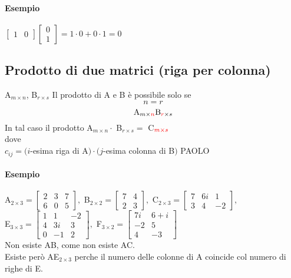 \paragraph{Esempio} 
$
\begin{bmatrix}
    1 & 0
\end{bmatrix}
\begin{bmatrix}
    0 \\1
\end{bmatrix}
=1\cdot 0 + 0\cdot 1= 0 $


\subsection{Prodotto di due matrici (riga per colonna) } 
A$_{m\times n}$, B$_{r\times s}$ Il prodotto di A e B è possibile solo se 
$$n = r$$
$$\textrm{A}_{m\times {\color{red}n}} \textrm{B}_{{\color{red}r}\times s}$$
In tal caso il prodotto 
A$_{m\times n}\cdot$ B$_{r\times s}=$ C$_{\color{red}m\times s}$\\
dove\\
$c_{ij}=(i$-esima riga di A$)\cdot(j$-esima colonna di B$)$
{\color{purple} PAOLO}

\paragraph{Esempio} 
A$_{2\times 3}=
\begin{bmatrix}
    2 & 3 & 7\\
    6 & 0 & 5 
\end{bmatrix},
$
B$_{2\times 2}=
\begin{bmatrix}
    7 & 4\\
    2 & 3
\end{bmatrix},
$
C$_{2\times 3}=
\begin{bmatrix}
    7 & 6i & 1\\
    3 & 4 & -2
\end{bmatrix},
$\\
E$_{3\times 3}=
\begin{bmatrix}
    1 & 1 & -2\\
    4 & 3i & 3\\
    0 & -1 & 2
\end{bmatrix},
$
F$_{3\times 2}=
\begin{bmatrix}
    7i & 6 + i\\
    -2 & 5 \\
    4 & -3
\end{bmatrix}
$\\
Non esiste AB, come non esiste AC.\\
Esiste però AE$_{2\times 3}$ perche il numero delle colonne di A coincide col numero di righe di E.

